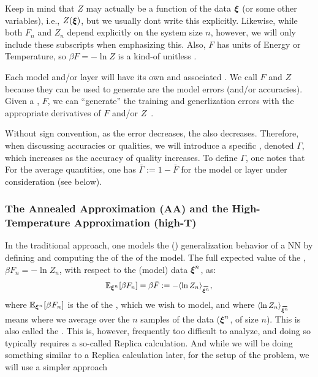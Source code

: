 Keep in mind that $Z$ may actually be a function of the data $\boldsymbol{\xi}$ (or some other variables),
i.e., $Z(\boldsymbol{\xi})$, but we usually dont write this explicitly.
Likewise, while  both $F_n$ and $Z_n$ depend explicitly on the system size $n$, however,
we will only include these subscripts when emphasizing this.
Also, $F$ has units of Energy or Temperature, so $\beta F=-\ln Z$ is a kind-of unitless \FreeEnergy.

Each model and/or layer will have its own \PartitionFunction and associated \GeneratingFunctions.
We call $F$ and $Z$ \emph{\GeneratingFunctions} because they can be used to generate are the model errors (and/or accuracies). 
Given a \FreeEnergy, $F$, we can ``generate'' the training and generlization errors with the appropriate derivatives of $F$ and/or $Z$~\cite{LTS90, Solla2023}.

Without sign convention,  as the error decreases, the \FreeEnergy also decreases.
Therefore, when discussing accuracies or qualities,
we will introduce a specific \GeneratingFunction, denoted $\Gamma$, which increases
as the accuracy of quality increases.  To define $\Gamma$, one notes that
For the average quantities, one has
 $\bar{\Gamma}:=1-\bar{F}$ for the model or layer under consideration (see below).


\subsubsection{The Annealed Approximation (AA) and the High-Temperature Approximation (high-T)}
\label{sxn:mathP_annealed}

In the traditional \SMOG approach, one models the (\Typical) generalization behavior of a NN
by defining and computing the \ExpectedValue of the \FreeEnergy of the model.
The full expected value  of the \FreeEnergy, $\beta F_{n}=-\ln Z_{n}$, with respect to the (model)
  data $\boldsymbol{\xi}^{n}$, as:
\begin{align}
  \mathbb{E}_{\NDXIn}[\beta F_n]=\beta\bar{F}:=-\langle \ln Z_{n}\rangle_{\AVGNDXIn},
\end{align}
where $\mathbb{E}_{\boldsymbol{\xi}^{n}}[\beta F_n]$ is the \ExpectedValue of the \FreeEnergy, which we wish to model, and 
where $\langle \ln Z_{n}\rangle_{\AVGNDXIn}$ means where we average over  the $n$ samples of the data ($\boldsymbol{\xi}^{n}$, of size $n$).  This is also called the \Quenched \FreeEnergy.
This is, however,  frequently too difficult to analyze, and doing so typically
requires a so-called Replica calculation. And while we will be doing something similar
to a Replica calculation later, for the setup of the problem, we will use a simpler approach


